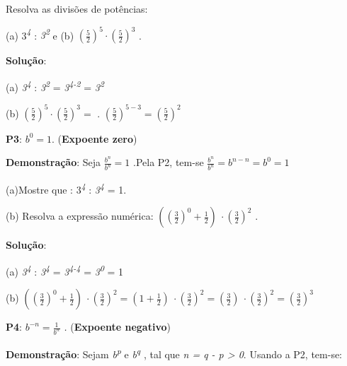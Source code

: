 \qedsymbol{}

\begin{texemplo}
Resolva as divisões de potências: 

  (a) 3\textit{\textsuperscript{4}} : \textit{3\textsuperscript{2}}   e   (b)  \(  \left( \frac{5}{2} \right) ^{5} \cdot  \left( \frac{5}{2} \right) ^{3} \) .

\textbf{Solução}: 

 (a) \textit{3\textsuperscript{4}} : \textit{3\textsuperscript{2}} = \textit{3\textsuperscript{4-2}} = \textit{3\textsuperscript{2}}  

 (b)  \(  \left( \frac{5}{2} \right) ^{5} \cdot  \left( \frac{5}{2} \right) ^{3}= \) . \(  \left( \frac{5}{2} \right) ^{5-3}= \left( \frac{5}{2} \right) ^{2} \)  \qedsymbol{}
\end{texemplo}

\begin{caixa}
\textbf{P3}: $b^0 = 1$. (\textbf{Expoente zero})
\end{caixa}

\textbf{Demonstração}: Seja  \( \frac{b^{n}}{b^{n}}=1 \) .Pela P2, tem-se   \( \frac{b^{n}}{b^{n}}=b^{n-n}=b^{0}=1 \)  \qedsymbol{}

\begin{texemplo}
    (a)Mostre que :   3\textit{\textsuperscript{4}} : \textit{3\textsuperscript{4}} = 1. 

    (b) Resolva a expressão numérica:  \(  \left(  \left( \frac{3}{2} \right) ^{0}+\frac{1}{2} \right) ~  \cdot  \left( \frac{3}{2} \right) ^{2} \) .

\textbf{Solução}: 

 (a) \textit{3\textsuperscript{4}} : \textit{3\textsuperscript{4}} = \textit{3\textsuperscript{4-4}} = \textit{3\textsuperscript{0}} = 1  

 (b)  \(  \left(  \left( \frac{3}{2} \right) ^{0}+\frac{1}{2} \right) ~  \cdot  \left( \frac{3}{2} \right) ^{2}= \left( 1+\frac{1}{2} \right) ~  \cdot  \left( \frac{3}{2} \right) ^{2}= \left( \frac{3}{2} \right) ~  \cdot  \left( \frac{3}{2} \right) ^{2}= \left( \frac{3}{2} \right) ^{3} \)  \qedsymbol{}
\end{texemplo}

\begin{caixa}
\textbf{P4}:  \( b^{-n}= \frac{1}{b^{n}} \)  \textit{. }(\textbf{Expoente negativo})
\end{caixa}

\textbf{Demonstração}: Sejam \textit{b\textsuperscript{p} }e  \textit{b\textsuperscript{q}} , tal que  \textit{n = q - p > 0}. Usando a P2, tem-se:

